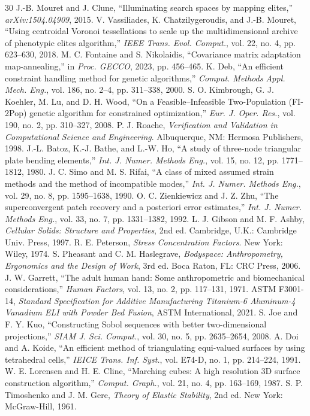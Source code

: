 \documentclass[10pt,journal,letterpaper]{IEEEtran}
\begin{document}
\begin{thebibliography}{30}
 J.-B. Mouret and J. Clune, ``Illuminating search spaces by mapping elites,'' \emph{arXiv:1504.04909}, 2015.
 V. Vassiliades, K. Chatzilygeroudis, and J.-B. Mouret, ``Using centroidal Voronoi tessellations to scale up the multidimensional archive of phenotypic elites algorithm,'' \emph{IEEE Trans. Evol. Comput.}, vol. 22, no. 4, pp. 623--630, 2018.
 M. C. Fontaine and S. Nikolaidis, ``Covariance matrix adaptation map-annealing,'' in \emph{Proc. GECCO}, 2023, pp. 456--465.
 K. Deb, ``An efficient constraint handling method for genetic algorithms,'' \emph{Comput. Methods Appl. Mech. Eng.}, vol. 186, no. 2--4, pp. 311--338, 2000.
 S. O. Kimbrough, G. J. Koehler, M. Lu, and D. H. Wood, ``On a Feasible--Infeasible Two-Population (FI-2Pop) genetic algorithm for constrained optimization,'' \emph{Eur. J. Oper. Res.}, vol. 190, no. 2, pp. 310--327, 2008.
 P. J. Roache, \emph{Verification and Validation in Computational Science and Engineering}. Albuquerque, NM: Hermosa Publishers, 1998.
 J.-L. Batoz, K.-J. Bathe, and L.-W. Ho, ``A study of three-node triangular plate bending elements,'' \emph{Int. J. Numer. Methods Eng.}, vol. 15, no. 12, pp. 1771--1812, 1980.
 J. C. Simo and M. S. Rifai, ``A class of mixed assumed strain methods and the method of incompatible modes,'' \emph{Int. J. Numer. Methods Eng.}, vol. 29, no. 8, pp. 1595--1638, 1990.
 O. C. Zienkiewicz and J. Z. Zhu, ``The superconvergent patch recovery and a posteriori error estimates,'' \emph{Int. J. Numer. Methods Eng.}, vol. 33, no. 7, pp. 1331--1382, 1992.
 L. J. Gibson and M. F. Ashby, \emph{Cellular Solids: Structure and Properties}, 2nd ed. Cambridge, U.K.: Cambridge Univ. Press, 1997.
 R. E. Peterson, \emph{Stress Concentration Factors}. New York: Wiley, 1974.
 S. Pheasant and C. M. Haslegrave, \emph{Bodyspace: Anthropometry, Ergonomics and the Design of Work}, 3rd ed. Boca Raton, FL: CRC Press, 2006.
 J. W. Garrett, ``The adult human hand: Some anthropometric and biomechanical considerations,'' \emph{Human Factors}, vol. 13, no. 2, pp. 117--131, 1971.
 ASTM F3001-14, \emph{Standard Specification for Additive Manufacturing Titanium-6 Aluminum-4 Vanadium ELI with Powder Bed Fusion}, ASTM International, 2021.
 S. Joe and F. Y. Kuo, ``Constructing Sobol sequences with better two-dimensional projections,'' \emph{SIAM J. Sci. Comput.}, vol. 30, no. 5, pp. 2635--2654, 2008.
 A. Doi and A. Koide, ``An efficient method of triangulating equi-valued surfaces by using tetrahedral cells,'' \emph{IEICE Trans. Inf. Syst.}, vol. E74-D, no. 1, pp. 214--224, 1991.
 W. E. Lorensen and H. E. Cline, ``Marching cubes: A high resolution 3D surface construction algorithm,'' \emph{Comput. Graph.}, vol. 21, no. 4, pp. 163--169, 1987.
 S. P. Timoshenko and J. M. Gere, \emph{Theory of Elastic Stability}, 2nd ed. New York: McGraw-Hill, 1961.
\end{thebibliography}
\end{document}
